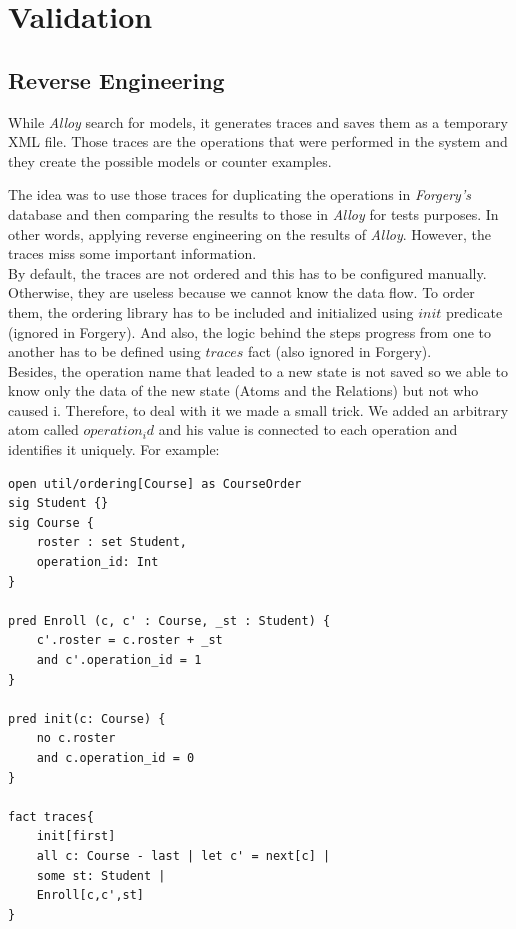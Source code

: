 \documentclass[oneside]{book}
\begin{document}
\newpage

\section{Validation}
\label{sec:validation}

\subsection{Reverse Engineering}
While \textit{Alloy} search for models, it generates traces and saves them as a temporary XML file. Those traces are the operations that were performed in the system and they create the possible models or counter examples.

The idea was to use those traces for duplicating the operations in \textit{Forgery's} database and then comparing the results to those in \textit{Alloy} for tests purposes. In other words, applying reverse engineering on the results of \textit{Alloy}. However, the traces miss some important information.\\ 

By default, the traces are not ordered and this has to be configured manually. Otherwise, they are useless because we cannot know the data flow. To order them, the ordering library has to be included and initialized using $init$ predicate (ignored in Forgery). And also, the logic behind the steps progress from one to another has to be defined using $traces$ fact (also ignored in Forgery).\\ 

Besides, the operation name that leaded to a new state is not saved so we able to know only the data of the new state (Atoms and the Relations) but not who caused i. Therefore, to deal with it we made a small trick. We added an arbitrary atom called $operation_id$ and his value is connected to each operation and identifies it uniquely. For example:\\

\begin{lstlisting}
open util/ordering[Course] as CourseOrder
sig Student {}
sig Course {
	roster : set Student,
	operation_id: Int
}

pred Enroll (c, c' : Course, _st : Student) {
	c'.roster = c.roster + _st
	and c'.operation_id = 1 
}

pred init(c: Course) {
	no c.roster
	and c.operation_id = 0
}

fact traces{
    init[first]
    all c: Course - last | let c' = next[c] | 
	some st: Student |
	Enroll[c,c',st]
}
\end{lstlisting}
\end{document}
